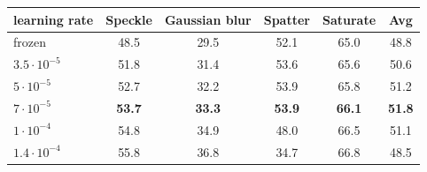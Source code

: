 \begin{tabular}{@{}l cccc c@{}}
\toprule
\vit{} learning rate & Speckle & Gaussian blur & Spatter & Saturate & Avg \\
\midrule
frozen & 48.5 & 29.5 & 52.1 & 65.0 & 48.8 \\
\midrule
$3.5{\cdot}10^{-5}$ & 51.8 & 31.4 & 53.6 & 65.6 & 50.6 \\
$5{\cdot}10^{-5}$ & 52.7 & 32.2 & 53.9 & 65.8 & 51.2 \\
\textbf{$7{\cdot}10^{-5}$} & \textbf{53.7} & \textbf{33.3} & \textbf{53.9} & \textbf{66.1} & \textbf{51.8} \\
$1{\cdot}10^{-4}$ & 54.8 & 34.9 & 48.0 & 66.5 & 51.1 \\
$1.4{\cdot}10^{-4}$ & 55.8 & 36.8 & 34.7 & 66.8 & 48.5 \\
\bottomrule
\end{tabular}

